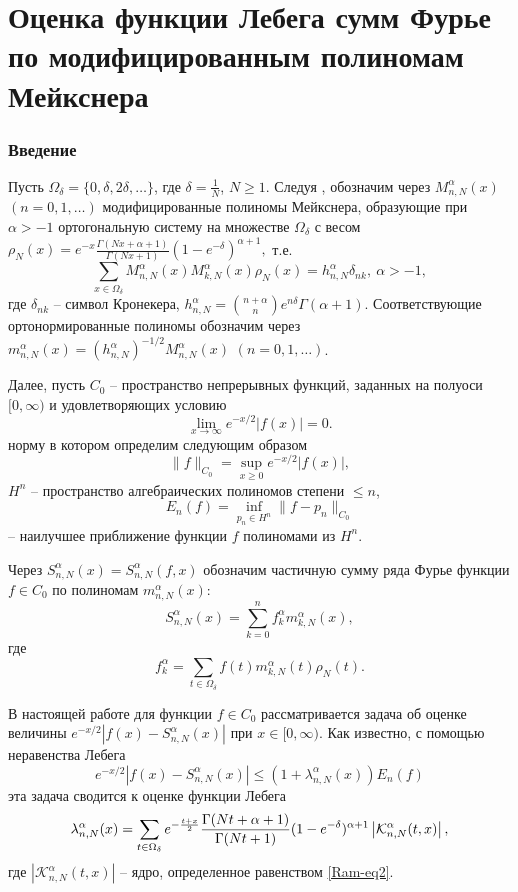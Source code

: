 

\chapter{Оценка функции Лебега сумм Фурье по модифицированным полиномам Мейкснера}
\subsection{Введение}

Пусть $\Omega_{\delta}=\{0, \delta, 2\delta, \ldots\}$, где $\delta=\frac{1}{N}$, $N\ge1$. Следуя \cite{RamSharMnog}, обозначим через $M_{n,N}^\alpha(x)$ $(n=0, 1, \dots)$ модифицированные полиномы Мейкснера, образующие при $\alpha>-1$ ортогональную систему на множестве $\Omega_{\delta}$ с весом
$\rho_N(x)=e^{-x}\frac{\Gamma(Nx+\alpha+1)}{\Gamma(Nx+1)}(1-e^{-\delta})^{\alpha+1},
$
т.е.
\begin{equation*}
\sum_{x\in\Omega_{\delta}} M_{n,N}^\alpha(x)M_{k,N}^\alpha(x)\rho_N(x)=h_{n,N}^\alpha\delta_{nk},\ \alpha>-1,
\end{equation*}
где $\delta_{nk}$ -- символ Кронекера, $h_{n,N}^\alpha={n+\alpha\choose n}e^{n\delta}\Gamma(\alpha+1).$
Соответствующие ортонормированные полиномы обозначим через $m_{n,N}^\alpha(x)=(h_{n,N}^\alpha)^{-1/2}M_{n,N}^\alpha(x)$ $(n=0, 1, \dots)$.

Далее, пусть $C_0$ -- пространство непрерывных функций, заданных на полуоси $[0,\infty)$ и удовлетворяющих условию
$$
\lim_{x\rightarrow\infty}e^{-x/2}|f(x)|=0.
$$
норму в котором определим следующим образом
$$
\|f\|_{C_0}=\sup_{x\geq0}e^{-x/2}|f(x)|,
$$
$H^n$ -- пространство алгебраических полиномов степени $\leq n$,
$$
E_n(f)=\inf_{p_n\in H^n}\|f-p_n\|_{C_0}
$$
-- наилучшее приближение функции $f$ полиномами из $H^n$.

Через $S_{n,N}^\alpha(x)=S^\alpha_{n,N}(f,x)$ обозначим частичную сумму ряда Фурье функции $f\in C_0$ по полиномам $m_{n,N}^\alpha(x)$:
$$
S_{n,N}^\alpha(x)=\sum_{k=0}^{n}f_k^\alpha m_{k,N}^\alpha(x),
$$
где
$$
f_k^{\alpha}=\sum_{t\in\Omega_\delta}f(t)m_{k,N}^\alpha(t)\rho_N(t).
$$

В настоящей работе для функции $f\in C_0$ рассматривается задача об оценке величины $e^{-x/2}|f(x)-S_{n,N}^\alpha(x)|$ при $x\in[0,\infty)$. Как известно, с помощью неравенства Лебега
$$
e^{-x/2}|f(x)-S_{n,N}^\alpha(x)|\leq (1+\lambda_{n,N}^\alpha(x))E_n(f)
$$
эта задача сводится к оценке функции Лебега
\begin{equation*}\label{RamLebFunc}
\lambda_{n,N}^{\alpha}(x)=
\sum_{t\in\Omega_{\delta}}e^{-{t+x\over 2}}{\Gamma(Nt+\alpha+1)\over\Gamma(Nt+1)}(1-e^{-\delta})^{\alpha+1}
\left|\mathcal{K}_{n,N}^\alpha(t,x)\right|,
\end{equation*}
где
$\left|\mathcal{K}_{n,N}^\alpha(t,x)\right|$ -- ядро, определенное равенством \eqref{Ram-eq2}.

